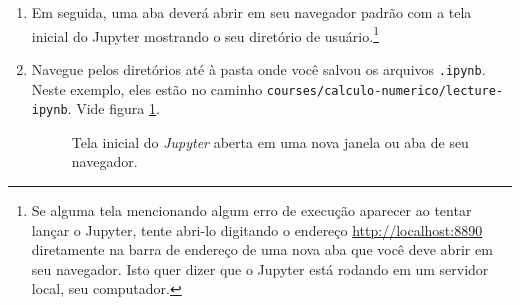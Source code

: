\documentclass[a4paper,12pt]{article}
\begin{document}
\begin{enumerate}
\begin{figure}[h!]
\end{figure}  
\item
  Em seguida, uma aba deverá abrir em seu navegador padrão com a tela
  inicial do Jupyter mostrando o seu diretório de
  usuário.\footnote{Se alguma tela mencionando algum erro de execução aparecer ao tentar lançar o Jupyter, tente abri-lo digitando o endereço \url{http://localhost:8890} diretamente na barra de endereço de uma nova aba que você deve abrir em seu navegador. Isto quer dizer que o Jupyter está rodando em um servidor local, seu computador.}
\item
  Navegue pelos diretórios até à pasta onde você salvou os arquivos
  \texttt{.ipynb}. Neste exemplo, eles estão no caminho
  \texttt{courses/calculo-numerico/lecture-ipynb}. Vide figura \ref{fig:jupyter}.
\begin{figure}[h!]
\centering
\caption{\label{fig:jupyter}Tela inicial do \emph{Jupyter} aberta em uma nova janela ou aba de seu navegador.}

\end{figure}
\end{enumerate}
\end{document}
